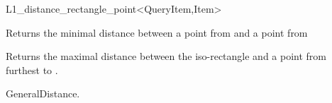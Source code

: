 \begin{ccRefClass}{L1_distance_rectangle_point<QueryItem,Item>}

{Returns the minimal distance between a point from  and a point from
}

{Returns the maximal distance between the iso-rectangle  and
a point from  furthest to .}


\ccSeeAlso

GeneralDistance.

\end{ccRefClass}


